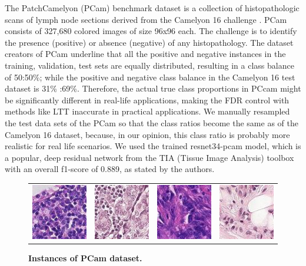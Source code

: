 \documentclass{article}
\begin{document}
The PatchCamelyon (PCam) benchmark dataset is a collection of histopathologic scans of lymph node sections \cite{Veeling2018-qh} derived from the Camelyon 16 challenge \cite{camelyon16}. PCam consists of 327,680 colored images of size 96x96 each. The challenge is to identify the presence (positive) or absence (negative) of any histopathology. The dataset creators of PCam underline that all the positive and negative instances in the training, validation, test sets are equally distributed, resulting in a class balance of 50:50\%; while the positive and negative class balance in the Camelyon 16 test dataset is 31\% :69\%. Therefore,  the actual true class proportions in PCcam might be significantly different in real-life applications, making the FDR control with methods like LTT inaccurate in practical applications. We manually resampled the test data sets of the PCam so that the class ratios become the same as of the Camelyon 16 dataset, because,  in our opinion,  this class ratio is probably more realistic for real life scenarios. We used the trained resnet34-pcam model, which is a popular, deep residual network from the TIA (Tissue Image Analysis) toolbox \cite{Pocock2022} with an overall f1-score of 0.889, as stated by the authors.


\begin{figure}[h!]
	\centering
	\begin{tabular}{cccc}
 		\includegraphics[width=1.in]{img/pcam1.jpg} &
		\includegraphics[width=1.in]{img/pcam2.jpg} & 
            \includegraphics[width=1.in]{img/pcam3.jpg} &
             \includegraphics[width=1.in]{img/pcam4.jpg}
        \end{tabular}
	\caption{{\bf Instances of PCam dataset.}}
	\label{fig:pcam_example}
\end{figure} 
\end{document}
